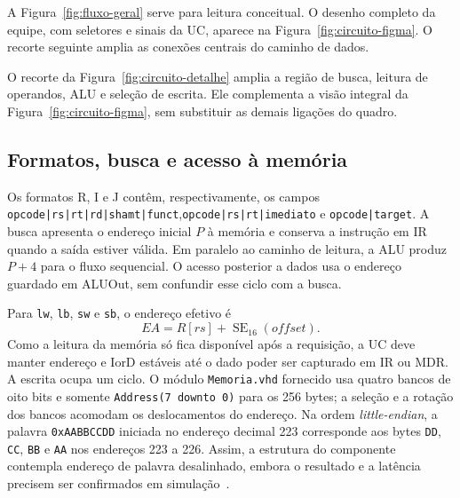 A Figura~\ref{fig:fluxo-geral} serve para leitura conceitual. O desenho completo da equipe, com seletores e sinais da UC, aparece na Figura~\ref{fig:circuito-figma}. O recorte seguinte amplia as conexões centrais do caminho de dados.


O recorte da Figura~\ref{fig:circuito-detalhe} amplia a região de busca, leitura de operandos, ALU e seleção de escrita. Ele complementa a visão integral da Figura~\ref{fig:circuito-figma}, sem substituir as demais ligações do quadro.


\subsection{Formatos, busca e acesso à memória}\label{subsec:busca}

Os formatos R, I e J contêm, respectivamente, os campos \texttt{opcode|rs|rt|rd|shamt|funct},\linebreak \texttt{opcode|rs|rt|imediato} e \texttt{opcode|target}. A busca apresenta o endereço inicial $P$ à memória e conserva a instrução em IR quando a saída estiver válida. Em paralelo ao caminho de leitura, a ALU produz $P+4$ para o fluxo sequencial. O acesso posterior a dados usa o endereço guardado em ALUOut, sem confundir esse ciclo com a busca.

Para \texttt{lw}, \texttt{lb}, \texttt{sw} e \texttt{sb}, o endereço efetivo é
\begin{equation}\label{eq:endereco-efetivo}
  EA = R[rs] + \operatorname{SE}_{16}(\textit{offset}).
\end{equation}
Como a leitura da memória só fica disponível após a requisição, a UC deve manter endereço e IorD estáveis até o dado poder ser capturado em IR ou MDR. A escrita ocupa um ciclo. O módulo \texttt{Memoria.vhd} fornecido usa quatro bancos de oito bits e somente \texttt{Address(7 downto 0)} para os 256 bytes; a seleção e a rotação dos bancos acomodam os deslocamentos do endereço. Na ordem \emph{little-endian}, a palavra \texttt{0xAABBCCDD} iniciada no endereço decimal 223 corresponde aos bytes \texttt{DD}, \texttt{CC}, \texttt{BB} e \texttt{AA} nos endereços 223 a 226. Assim, a estrutura do componente contempla endereço de palavra desalinhado, embora o resultado e a latência precisem ser confirmados em simulação~\cite{especificacao,docpt3}.


